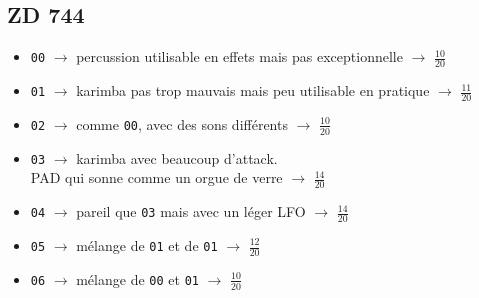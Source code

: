 \documentclass[a4paper, 13pt]{article}
\begin{document}
\vspace{2cm}
\subsection*{ZD 744}
\begin{itemize}
    \item \texttt{00} $\rightarrow$ percussion utilisable en effets mais pas exceptionnelle $\rightarrow$ \Large{$\frac{10}{20}$} \normalsize \vspace{0.2cm}
    \item \texttt{01} $\rightarrow$ karimba pas trop mauvais mais peu utilisable en pratique $\rightarrow$ \Large{$\frac{11}{20}$} \normalsize \vspace{0.2cm}
    \item \texttt{02} $\rightarrow$ comme \texttt{00}, avec des sons différents $\rightarrow$ \Large{$\frac{10}{20}$} \normalsize \vspace{0.2cm}
    \item \texttt{03} $\rightarrow$ karimba avec beaucoup d'attack. \\ PAD qui sonne comme un orgue de verre $\rightarrow$ \Large{$\frac{14}{20}$} \normalsize \vspace{0.2cm}
    \item \texttt{04} $\rightarrow$ pareil que \texttt{03} mais avec un léger LFO $\rightarrow$ \Large{$\frac{14}{20}$} \normalsize \vspace{0.2cm}
    \item \texttt{05} $\rightarrow$ mélange de \texttt{01} et de \texttt{01} $\rightarrow$ \Large{$\frac{12}{20}$} \normalsize \vspace{0.2cm}
    \item \texttt{06} $\rightarrow$ mélange de \texttt{00} et \texttt{01} $\rightarrow$ \Large{$\frac{10}{20}$} \normalsize \vspace{0.2cm}
\end{itemize}


\vspace{1.5cm}
\end{document}
